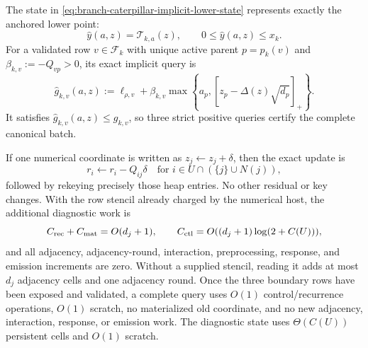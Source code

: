 \begin{lemma}
\label{lem:branch-caterpillar-implicit-lower-heap}
The state in
\cref{eq:branch-caterpillar-implicit-lower-state} represents exactly the
anchored lower point:
\begin{equation}
 \widehat y(a,z)=\mathcal T_{k,a}(z),
 \qquad
 0\leq\widehat y(a,z)\leq x_k.
 \label{eq:branch-caterpillar-implicit-lower-equality}
\end{equation}
For a validated row $v\in\mathcal F_k$ with unique active parent
$p=p_k(v)$ and $\beta_{k,v}:=-Q_{vp}>0$, its exact implicit query is
\begin{equation}
 \widehat g_{k,v}(a,z)
 :=\ell_{\rho,v}+\beta_{k,v}
 \max\left\{a_p,[z_p-\Delta(z)\sqrt{d_p}]_+\right\}.
 \label{eq:branch-caterpillar-implicit-lower-query}
\end{equation}
It satisfies $\widehat g_{k,v}(a,z)\leq g_{k,v}$, so three strict positive
queries certify the complete canonical batch.

If one numerical coordinate is written as $z_j\leftarrow z_j+\delta$, then
the exact update is
\begin{equation}
 r_i\leftarrow r_i-Q_{ij}\delta
 \quad\text{for }i\in U\cap(\{j\}\cup N(j)),
 \label{eq:branch-caterpillar-implicit-lower-update}
\end{equation}
followed by rekeying precisely those heap entries.  No other residual or key
changes.  With the row stencil already charged by the numerical host, the
additional diagnostic work is
\begin{equation}
 C_{\rm rec}+C_{\rm mat}=O(d_j+1),
 \qquad
 C_{\rm ctl}=O((d_j+1)\log(2+C(U))),
 \label{eq:branch-caterpillar-implicit-lower-local-cost}
\end{equation}
and all adjacency, adjacency-round, interaction, preprocessing, response,
and emission increments are zero.  Without a supplied stencil, reading it
adds at most $d_j$ adjacency cells and one adjacency round.  Once the three
boundary rows have been exposed and validated, a complete query uses
$O(1)$ control/recurrence operations, $O(1)$ scratch, no materialized old
coordinate, and no new adjacency, interaction, response, or emission work.
The diagnostic state uses $\Theta(C(U))$ persistent cells and $O(1)$ scratch.
\end{lemma}

